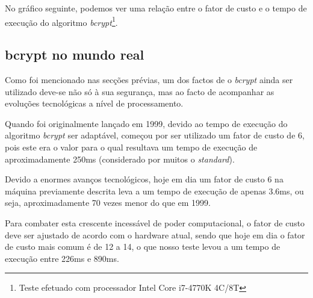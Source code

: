 \newpage
No gráfico seguinte, podemos ver uma relação entre o fator de custo e o tempo de execução do algoritmo \emph{bcrypt}\footnote{Teste efetuado com processador Intel Core i7-4770K 4C/8T}.

\begin{center}
\end{center}

\subsection{bcrypt no mundo real}

Como foi mencionado nas secções prévias, um dos factos de o \emph{bcrypt} ainda ser utilizado deve-se não só à sua segurança, mas ao facto de acompanhar as evoluções tecnológicas a nível de processamento.

Quando foi originalmente lançado em 1999, devido ao tempo de execução do algoritmo \emph{bcrypt} ser adaptável, começou por ser utilizado um fator de custo de 6, pois este era o valor para o qual resultava um tempo de execução de aproximadamente 250ms (considerado por muitos o \emph{standard}).

Devido a enormes avanços tecnológicos, hoje em dia um fator de custo 6 na máquina previamente descrita leva a um tempo de execução de apenas 3.6ms, ou seja, aproximadamente 70 vezes menor do que em 1999.

Para combater esta crescente incessável de poder computacional, o fator de custo deve ser ajustado de acordo com o hardware atual, sendo que hoje em dia o fator de custo mais comum é de 12 a 14, o que nosso teste levou a um tempo de execução entre 226ms e 890ms.

